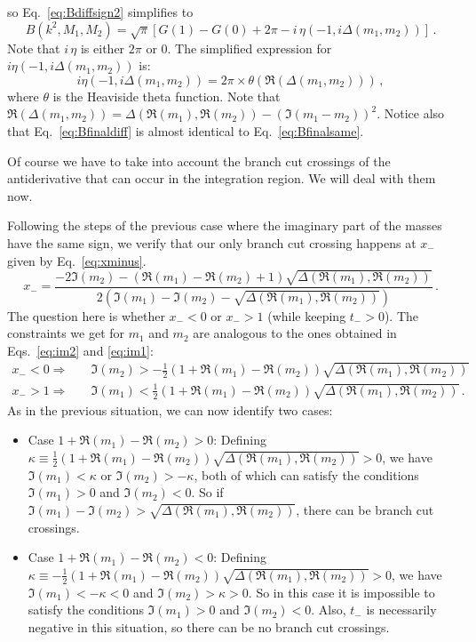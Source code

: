 \documentclass[twoside]{article}
\begin{document}
so Eq.~\eqref{eq:Bdiffsign2} simplifies to
\begin{equation}
\label{eq:Bfinaldiff}
B(k^2,M_1,M_2) = \sqrt{\pi}\left[G(1) - G(0) + 2\pi - i \, \eta(-1, i \Delta(m_1, m_2)) \right]\,.
\end{equation}
Note that $i \, \eta$ is either $2\pi$ or 0.
The simplified expression for $i \eta(-1, i \Delta(m_1, m_2))$ is:
\begin{equation}
i \eta(-1, i \Delta(m_1, m_2)) = 2  \pi \times \theta\left(\Re(\Delta(m_1,m_2)) \right)\,,
\end{equation}
where $\theta$ is the Heaviside theta function. Note that $\Re(\Delta(m_1,m_2)) = \Delta(\Re(m_1), \Re(m_2)) - (\Im(m_1 - m_2))^2$. 
Notice also that Eq.~\eqref{eq:Bfinaldiff} is almost identical to Eq.~\eqref{eq:Bfinalsame}.


Of course we have to take into account the branch cut crossings of the antiderivative that can occur in the integration region. We will deal with them now.

Following the steps of the previous case where the imaginary part of the masses have the same sign, we verify that our only branch cut crossing happens at $x_-$ given by Eq.~\eqref{eq:xminus}.
\begin{equation}
x_- = \frac{- 2 \Im(m_2) - (\Re(m_1)-\Re(m_2)+1) \sqrt{\Delta(\Re(m_1), \Re(m_2))}}{2 \left(\Im(m_1)-\Im(m_2)-\sqrt{\Delta(\Re(m_1), \Re(m_2))}\right)}\,.
\end{equation}
The question here is whether $x_- < 0$ or $x_- > 1$ (while keeping $t_- > 0$). The constraints we get for $m_1$ and $m_2$ are analogous to the ones obtained in Eqs.~\eqref{eq:im2} and \eqref{eq:im1}:
\begin{align}
x_- < 0 \Rightarrow \quad & \Im(m_2) > -\frac{1}{2} (1 + \Re(m_1) - \Re(m_2)) \sqrt{\Delta(\Re(m_1), \Re(m_2))} \\
x_- > 1 \Rightarrow \quad& \Im(m_1) < \frac{1}{2} (1 + \Re(m_1) - \Re(m_2)) \sqrt{\Delta(\Re(m_1), \Re(m_2))}\,.
\end{align}
As in the previous situation, we can now identify two cases:
\begin{itemize}
\item Case $1 + \Re(m_1) - \Re(m_2)> 0$: Defining $\kappa \equiv \frac{1}{2} (1 + \Re(m_1) - \Re(m_2)) \sqrt{\Delta(\Re(m_1), \Re(m_2))} >0$, we have $\Im(m_1) < \kappa $ or $\Im(m_2) > -\kappa $, both of which can satisfy the conditions $\Im(m_1)>0$ and $\Im(m_2)<0$. So if $\Im(m_1) - \Im(m_2) > \sqrt{\Delta(\Re(m_1), \Re(m_2))}$, there can be  branch cut crossings.

\item Case $1 + \Re(m_1) - \Re(m_2) < 0$: Defining $\kappa \equiv -\frac{1}{2} (1 + \Re(m_1) - \Re(m_2)) \sqrt{\Delta(\Re(m_1), \Re(m_2))} >0$, we have $\Im(m_1) < -\kappa < 0$ and $\Im(m_2) > \kappa > 0$. So in this case it is impossible to satisfy the conditions $\Im(m_1)>0$ and $\Im(m_2)<0$. Also, $t_-$ is necessarily negative in this situation, so there can be no branch cut crossings.
\end{itemize}
\end{document}
